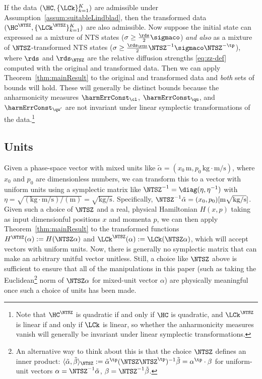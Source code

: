\documentclass{article}
\numberwithin{equation}{section}
\begin{document}
If the data $(\HC, \{\LCk\}_{k=1}^K)$ are admissible under Assumption~\ref{assum:suitableLindblad}, then the transformed data $(\HC^\NTSZ, \{\LCk^\NTSZ\}_{k=1}^K)$ are also admissible. Now suppose  the initial state can expressed as a mixture of NTS states ($\sigma \ge \frac{\rds}{2} \sigmaco$) \emph{and also} as a mixture of $\NTSZ$-transformed NTS states ($\sigma \ge \frac{\rds_\NTSZ}{2} \NTSZ^{-1}\sigmaco\NTSZ^{-\tp}$), where $\rds$ and $\rds_\NTSZ$ are the relative diffusion strengths \eqref{eq:zz-def} computed with the original and transformed data. Then we can apply Theorem~\ref{thm:mainResult} to the original and transformed data and \emph{both} sets of bounds will hold. These will generally be distinct bounds because the anharmonicity measures $\harmErrConst_\cl$, $\harmErrConst_\qu$, and $\harmErrConst_{\qu'}$ are not invariant under linear symplectic transformations of the data.\footnote{Note that $\HC^\NTSZ$ is quadratic if and only if $\HC$ is quadratic, and $\LCk^\NTSZ$ is linear if and only if $\LCk$ is linear, so whether the anharmonicity measures vanish will generally be invariant under linear symplectic transformations.}





\subsection{Units}

Given a phase-space vector with mixed units like $\tilde{\alpha} = (x_0 \,\mathrm{m}, p_0\,\mathrm{kg}\!\cdot\!\mathrm{m}/\mathrm{s})$, where $x_0$ and $p_0$ are dimensionless numbers, we can transform this to a vector with uniform units using a symplectic matrix like $\NTSZ^{-1} = \diag(\eta,\eta^{-1})$ with $\eta = \sqrt{(\mathrm{kg}\!\cdot\!\mathrm{m}/\mathrm{s})/(\mathrm{m})} = \sqrt{\mathrm{kg}/\mathrm{s}}$. Specifically, $\NTSZ^{-1}\tilde\alpha = (x_0,p_0)[\mathrm{m}\sqrt{\mathrm{kg}/\mathrm{s}}]$.  Given such a choice of $\NTSZ$ and a real, physical Hamiltonian $H(x,p)$ taking
as input dimensionful positions $x$ and momenta $p$, we can then apply Theorem~\ref{thm:mainResult} to the transformed functions
$H^\NTSZ(\alpha):=H(\NTSZ\alpha)$ and $\LCk^\NTSZ(\alpha):=\LCk(\NTSZ\alpha)$, which will accept vectors with uniform units.
Now, there is generally no symplectic matrix that can make an arbitrary unitful vector unitless.  Still, a choice like $\NTSZ$ above is sufficient to ensure that all of the manipulations in this paper (such as taking the Euclidean\footnote{An alternative way to think about this is that the choice $\NTSZ$ defines an inner product: $\langle\tilde\alpha,\tilde\beta\rangle_\NTSZ := {\tilde\alpha}^\tp(\NTSZ\NTSZ^\tp)^{-1}\tilde\beta = \alpha^\tp \cdot \beta$ for uniform-unit vectors $\alpha = \NTSZ^{-1}\tilde\alpha$, $\beta = \NTSZ^{-1}\tilde\beta$.} 
norm of $\NTSZ\alpha$ for mixed-unit vector $\alpha$) are physically meaningful once such a choice of units has been made.  
\end{document}

